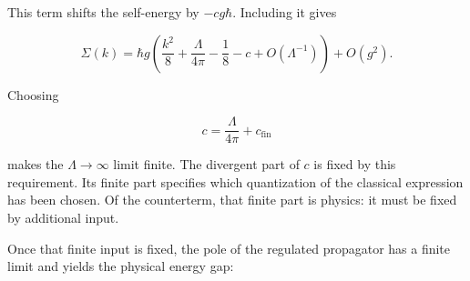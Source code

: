 This term shifts the self-energy by $-cg\hbar$. Including it gives

\begin{equation}
 \Sigma(k)=\hbar g\left(
 \frac{k^2}{8}+\frac{\Lambda}{4\pi}-\frac{1}{8}-c
 +O(\Lambda^{-1})\right)+O(g^2).
 \label{eq:253a-counterterm-self-energy}
\end{equation}

Choosing

\begin{equation}
 c=\frac{\Lambda}{4\pi}+c_{\mathrm{fin}}
 \label{eq:253a-counterterm-choice}
\end{equation}

makes the $\Lambda\to\infty$ limit finite. The divergent part of $c$ is fixed
by this requirement. Its finite part specifies which quantization of the
classical expression has been chosen. Of the counterterm, that finite part is
physics: it must be fixed by additional input.

Once that finite input is fixed, the pole of the regulated propagator has a
finite limit and yields the physical energy gap:


